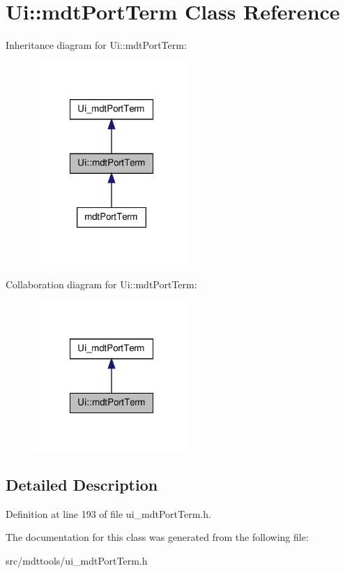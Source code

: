 \hypertarget{class_ui_1_1mdt_port_term}{
\section{Ui::mdtPortTerm Class Reference}
\label{class_ui_1_1mdt_port_term}
}


Inheritance diagram for Ui::mdtPortTerm:\nopagebreak
\begin{figure}[H]
\begin{center}
\leavevmode
\includegraphics[width=168pt]{class_ui_1_1mdt_port_term__inherit__graph}
\end{center}
\end{figure}


Collaboration diagram for Ui::mdtPortTerm:\nopagebreak
\begin{figure}[H]
\begin{center}
\leavevmode
\includegraphics[width=168pt]{class_ui_1_1mdt_port_term__coll__graph}
\end{center}
\end{figure}


\subsection{Detailed Description}


Definition at line 193 of file ui\_\-mdtPortTerm.h.



The documentation for this class was generated from the following file:\begin{DoxyCompactItemize}
\item 
src/mdttools/ui\_\-mdtPortTerm.h\end{DoxyCompactItemize}
